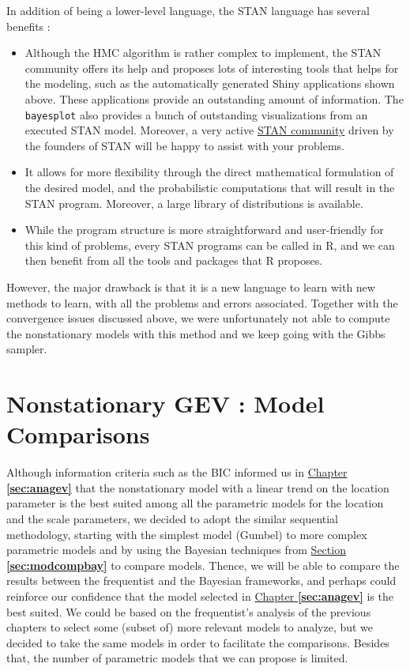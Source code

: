  In addition of being a lower-level language, the STAN language has several benefits : 
 
 \begin{itemize}
 	\item  Although the HMC algorithm is rather complex to implement, the STAN community offers its help and proposes lots of interesting tools that helps for the modeling, such as the automatically generated Shiny applications shown above. These applications provide an outstanding amount of information. The \texttt{bayesplot} also provides a bunch of outstanding visualizations from an executed STAN model. Moreover, a very active 		 \href{https://groups.google.com/forum/#!forum/stan-users}{STAN community} driven by the founders of STAN will be happy to assist with your problems. 
 	
 	\item It allows for more flexibility through the direct mathematical formulation of the desired model, and the probabilistic computations that will result in the STAN program. Moreover, a large library
 	of distributions is available.
 	
 	\item While the program structure is more straightforward and user-friendly for this kind of problems, every STAN programs can be called in R, and we can then benefit from all the tools and packages that R proposes.
 \end{itemize}
However, the major drawback is that it is a new language to learn with new methods to learn, with all the problems and errors associated. Together with the convergence issues discussed above, we were unfortunately not able to compute the nonstationary models with this method and we keep going with the Gibbs sampler.


\section{Nonstationary GEV : Model Comparisons}\label{sec:baycomp}

Although information criteria such as the BIC informed us in \hyperref[sec:anagev]{Chapter \textbf{\ref{sec:anagev}}} that the nonstationary model with a linear trend on the location parameter is the best suited among all the parametric models for the location and the scale parameters, we decided to adopt the similar sequential methodology, starting with the simplest model (Gumbel) to more complex parametric models and by using the Bayesian techniques from \hyperref[sec:modcompbay]{Section \textbf{\ref{sec:modcompbay}}} to compare models. Thence, we will be able to compare the results between the frequentist and the Bayesian frameworks, and perhaps could reinforce our confidence that the model selected in \hyperref[sec:anagev]{Chapter \textbf{\ref{sec:anagev}}} is the best suited.
We could be based on the frequentist's analysis of the previous chapters to select some (subset of) more relevant models to analyze, but we decided to take the same models in order to facilitate the comparisons. Besides that, the number of parametric models that we can propose  is limited.


